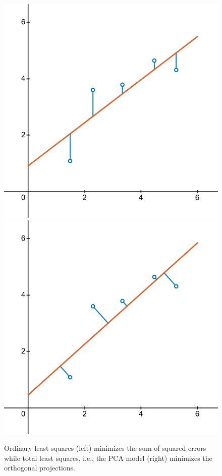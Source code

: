\begin{figure}
    \centering
    \includegraphics[width=.4\linewidth]{figs/fig-least-squares.png}
    \hfill
    \includegraphics[width=.4\linewidth]{figs/fig-orthogonal-regression.png}
    \caption{Ordinary least squares (left) minimizes the sum of squared errors while total least squares, i.e., the PCA model (right) minimizes the orthogonal projections.}
    \label{fig:ols-pca}
\end{figure}